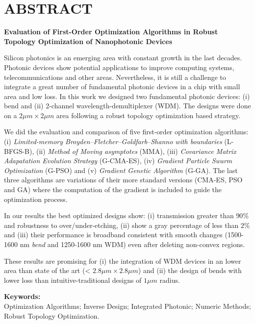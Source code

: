 \chapter*{\center \Large \vspace{-5.5cm} ABSTRACT}

\begin{center}
\Large \vspace{-1.5cm} \textbf{Evaluation of First-Order Optimization Algorithms in Robust Topology Optimization of Nanophotonic Devices}
\end{center}

Silicon photonics is an emerging area with constant growth in the last decades.
Photonic devices show potential applications to improve computing systems, telecommunications and other areas.
Nevertheless, it is still a challenge to integrate a great number of fundamental photonic
devices in a chip with small area and low loss.
In this work we designed two fundamental photonic devices: (i) bend and (ii)
2-channel wavelength-demultiplexer (WDM).
The designs were done on a $2 \mu m \times 2 \mu m$ area following a robust topology
optimization based strategy.

We did the evaluation and comparison of five first-order optimization algorithms:
(i) \emph{Limited-memory Broyden–Fletcher–Goldfarb–Shanno with boundaries} (L-BFGS-B), 
(ii) \emph{Method of Moving asymptotes} (MMA), 
(iii) \emph{Covariance Matrix Adapatation Evolution Strategy} (G-CMA-ES), (iv) \emph{Gradient Particle Swarm
Optimization} (G-PSO) and (v) \emph{Gradient Genetic Algorithm} (G-GA). 
The last three algorithms are variations of their more standard versions (CMA-ES, PSO and GA)
where the computation of the gradient is included to guide the optimization process.

In our results the best optimized designs show:
(i) transmission greater than $90 \%$ and robustness to over/under-etching,
(ii) show a gray percentage of less than $2 \%$ and
(iii) their performance is broadband consistent with smooth changes 
(1500-1600 nm \emph{bend} and 1250-1600 nm WDM) even after deleting non-convex regions.

These results are promising for 
(i) the integration of WDM devices in an lower area than 
state of the art (< $2.8 \mu m \times 2.8 \mu m$) and 
(ii) the design of bends with lower loss than intuitive-traditional designs of $1 \mu m$ radius.

\noindent \textbf{Keywords:}\\
\noindent Optimization Algorithms; Inverse Design; Integrated Photonic; Numeric Methods; Robust Topology
Optimization.

